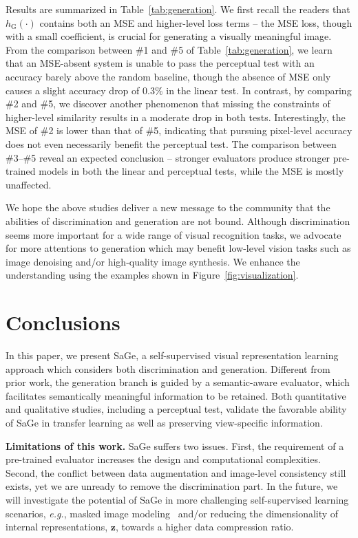 \documentclass[10pt,twocolumn,letterpaper]{article}
\begin{document}
Results are summarized in Table~\ref{tab:generation}. We first recall the readers that $h_\mathrm{G}(\cdot)$ contains both an MSE and higher-level loss terms -- the MSE loss, though with a small coefficient, is crucial for generating a visually meaningful image. From the comparison between \#1 and \#5 of Table~\ref{tab:generation}, we learn that an MSE-absent system is unable to pass the perceptual test with an accuracy barely above the random baseline, though the absence of MSE only causes a slight accuracy drop of $0.3\%$ in the linear test. In contrast, by comparing \#2 and \#5, we discover another phenomenon that missing the constraints of higher-level similarity results in a moderate drop in both tests. Interestingly, the MSE of \#2 is lower than that of \#5, indicating that pursuing pixel-level accuracy does not even necessarily benefit the perceptual test. The comparison between \#3--\#5 reveal an expected conclusion -- stronger evaluators produce stronger pre-trained models in both the linear and perceptual tests, while the MSE is mostly unaffected.

We hope the above studies deliver a new message to the community that the abilities of discrimination and generation are not bound. Although discrimination seems more important for a wide range of visual recognition tasks, we advocate for more attentions to generation which may benefit low-level vision tasks such as image denoising and/or high-quality image synthesis. We enhance the understanding using the examples shown in Figure~\ref{fig:visualization}.

\section{Conclusions}

In this paper, we present SaGe, a self-supervised visual representation learning approach which considers both discrimination and generation. Different from prior work, the generation branch is guided by a semantic-aware evaluator, which facilitates semantically meaningful information to be retained. Both quantitative and qualitative studies, including a perceptual test, validate the favorable ability of SaGe in transfer learning as well as preserving view-specific information.

\vspace{0.1cm}\noindent
\textbf{Limitations of this work.} SaGe suffers two issues. First, the requirement of a pre-trained evaluator increases the design and computational complexities. Second, the conflict between data augmentation and image-level consistency still exists, yet we are unready to remove the discrimination part. In the future, we will investigate the potential of SaGe in more challenging self-supervised learning scenarios, \textit{e.g.}, masked image modeling~\cite{bao2021beit} and/or reducing the dimensionality of internal representations, $\mathbf{z}$, towards a higher data compression ratio.
\end{document}
